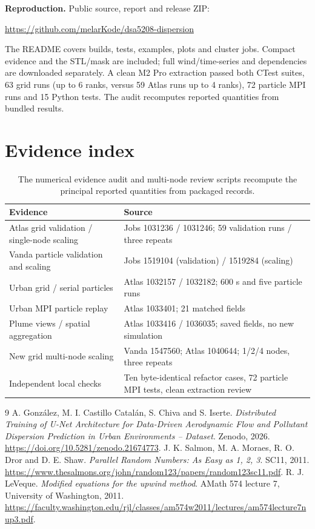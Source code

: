 \documentclass[11pt,a4paper]{article}
\begin{document}
\textbf{Reproduction.} Public source, report and release ZIP:\par
\url{https://github.com/melarKode/dsa5208-dispersion}\par
The README covers builds, tests, examples, plots and cluster jobs. Compact evidence and the STL/mask are included; full wind/time-series and dependencies are downloaded separately. A clean M2 Pro extraction passed both CTest suites, 63 grid runs (up to 6 ranks, versus 59 Atlas runs up to 4 ranks), 72 particle MPI runs and 15 Python tests. The audit recomputes reported quantities from bundled results.
\clearpage

\section*{Evidence index}
\begin{table}[H]\centering\small
\begin{tabular}{p{.40\linewidth}p{.51\linewidth}}\toprule
Evidence & Source\\\midrule
Atlas grid validation / single-node scaling & Jobs 1031236 / 1031246; 59 validation runs / three repeats\\
Vanda particle validation and scaling & Jobs 1519104 (validation) / 1519284 (scaling)\\
Urban grid / serial particles & Atlas 1032157 / 1032182; 600 s and five particle runs\\
Urban MPI particle replay & Atlas 1033401; 21 matched fields\\
Plume views / spatial aggregation & Atlas 1033416 / 1036035; saved fields, no new simulation\\
New grid multi-node scaling & Vanda 1547560; Atlas 1040644; 1/2/4 nodes, three repeats\\
Independent local checks & Ten byte-identical refactor cases, 72 particle MPI tests, clean extraction review\\\bottomrule
\end{tabular}
\caption{The numerical evidence audit and multi-node review scripts recompute the principal reported quantities from packaged records.}
\end{table}

\begin{thebibliography}{9}
 A. Gonz\'alez, M. I. Castillo Catal\'an, S. Chiva and S. Iserte. \emph{Distributed Training of U-Net Architecture for Data-Driven Aerodynamic Flow and Pollutant Dispersion Prediction in Urban Environments -- Dataset}. Zenodo, 2026. \url{https://doi.org/10.5281/zenodo.21674773}.
 J. K. Salmon, M. A. Moraes, R. O. Dror and D. E. Shaw. \emph{Parallel Random Numbers: As Easy as 1, 2, 3}. SC11, 2011. \url{https://www.thesalmons.org/john/random123/papers/random123sc11.pdf}.
 R. J. LeVeque. \emph{Modified equations for the upwind method}. AMath 574 lecture 7, University of Washington, 2011. \url{https://faculty.washington.edu/rjl/classes/am574w2011/lectures/am574lecture7nup3.pdf}.
\end{thebibliography}
\end{document}
